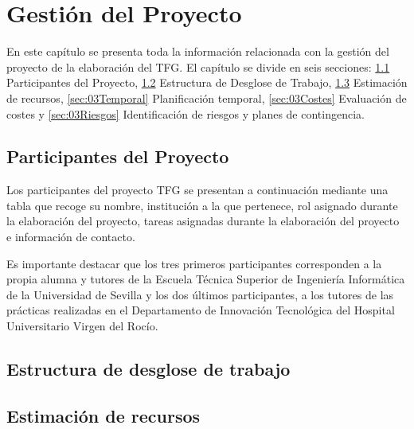 \chapter{Gestión del Proyecto}\label{cap:03gestión}

En este capítulo se presenta toda la información relacionada con la gestión del proyecto de la elaboración del TFG. El capítulo se divide en seis secciones: \ref{sec:03Participantes} Participantes del Proyecto, \ref{sec:03EDT} Estructura de Desglose de Trabajo, \ref{sec:03Recursos} Estimación de recursos, \ref{sec:03Temporal} Planificación temporal, \ref{sec:03Costes} Evaluación de costes y \ref{sec:03Riesgos} Identificación de riesgos y planes de contingencia.

\section{Participantes del Proyecto} \label{sec:03Participantes}

Los participantes del proyecto TFG se presentan a continuación mediante una tabla que recoge su nombre, institución a la que pertenece, rol asignado durante la elaboración del proyecto, tareas asignadas durante la elaboración del proyecto e información de contacto. 

Es importante destacar que los tres primeros participantes corresponden a la propia alumna y tutores de la Escuela Técnica Superior de Ingeniería Informática de la Universidad de Sevilla y los dos últimos participantes, a los tutores de las prácticas realizadas en el Departamento de Innovación Tecnológica del Hospital Universitario Virgen del Rocío.











\section{Estructura de desglose de trabajo} \label{sec:03EDT}



\section{Estimación de recursos} \label{sec:03Recursos}


